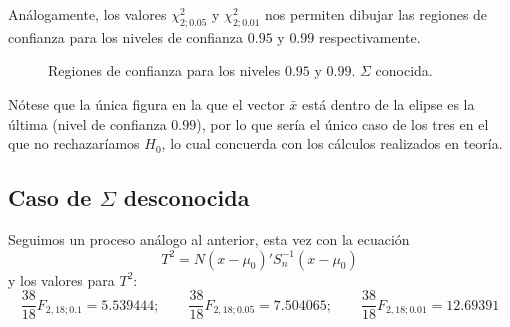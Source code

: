 \documentclass[12pt]{article}
\begin{document}
Análogamente, los valores $\chi^2_{2;0.05}$ y $\chi^2_{2;0.01}$ nos
permiten dibujar las regiones de confianza para los niveles de
confianza $0.95$ y $0.99$ respectivamente.
\vspace{-4mm}
\begin{figure}[H]
  \centering
  \caption{Regiones de confianza para los niveles $0.95$ y $0.99$. $\Sigma$ conocida.}
  \label{fig:con-005-001}
\end{figure}

Nótese que la única figura en la que el vector $\bar{x}$ está dentro
de la elipse es la última (nivel de confianza $0.99$), por lo que
sería el único caso de los tres en el que no rechazaríamos $H_0$, lo
cual concuerda con los cálculos realizados en teoría.

\subsection{Caso de $\Sigma$ desconocida}

Seguimos un proceso análogo al anterior, esta vez con la ecuación
\[T^2=N(x-\mu_0)'S_n^{-1}(x-\mu_0)\]
y los valores para $T^2$:
\[\frac{38}{18}F_{2,18;0.1}=5.539444; \qquad \frac{38}{18}F_{2,18;0.05}=7.504065; \qquad \frac{38}{18}F_{2,18;0.01}=12.69391\]
\end{document}
